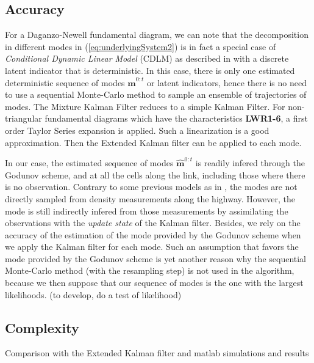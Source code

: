 \documentclass[11pt]{article}
\numberwithin{equation}{section}
\numberwithin{figure}{section}
\numberwithin{table}{section}
\begin{document}
\subsection{Accuracy}

For a Daganzo-Newell fundamental diagram, we can note that the decomposition in different modes in (\ref{eq:underlyingSystem2}) is in fact a special case of \textit{Conditional Dynamic Linear Model} (CDLM) as described in \cite{Chen2000} with a discrete latent indicator that is deterministic. In this case, there is only one estimated deterministic sequence of modes $\hat{\boldsymbol m}^{0:t}$ or latent indicators, hence there is no need to use a sequential Monte-Carlo method to sample an ensemble of trajectories of modes. The Mixture Kalman Filter \cite{Chen2000} reduces to a simple Kalman Filter. For non-triangular fundamental diagrams which have the characteristics \textbf{LWR1-6}, a first order Taylor Series expansion is applied. Such a linearization is a good approximation. Then the Extended Kalman filter can be applied to each mode.

In our case, the estimated sequence of modes $\hat{\boldsymbol m}^{0:t}$ is readily infered through the Godunov scheme, and at all the cells along the link, including those where there is no observation. Contrary to some previous models as in \cite{Munoz2003}, the modes are not directly sampled from density measurements along the highway. However, the mode is still indirectly infered from those measurements by assimilating the observations with the \textit{update state} of the Kalman filter. Besides, we rely on the accuracy of the estimation of the mode provided by the Godunov scheme when we apply the Kalman filter for each mode. Such an assumption that favors the mode provided by the Godunov scheme is yet another reason why the sequential Monte-Carlo method (with the resampling step) is not used in the algorithm, because we then suppose that our sequence of modes is the one with the largest likelihoods. (to develop, do a test of likelihood)

\subsection{Complexity}

Comparison with the Extended Kalman filter and matlab simulations and results



\end{document}
